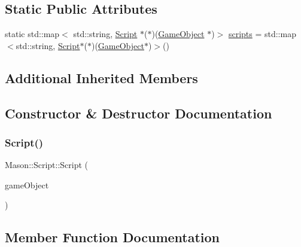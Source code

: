 \subsection*{Static Public Attributes}
\begin{DoxyCompactItemize}
\item 
static std\+::map$<$ std\+::string, \hyperlink{class_mason_1_1_script}{Script} $\ast$($\ast$)(\hyperlink{class_mason_1_1_game_object}{Game\+Object} $\ast$)$>$ \hyperlink{class_mason_1_1_script_ad7f94424b50f1a841d25c5efe95f3c73}{scripts} = std\+::map$<$std\+::string, \hyperlink{class_mason_1_1_script}{Script}$\ast$($\ast$)(\hyperlink{class_mason_1_1_game_object}{Game\+Object}$\ast$)$>$()
\end{DoxyCompactItemize}
\subsection*{Additional Inherited Members}


\subsection{Constructor \& Destructor Documentation}
\hypertarget{class_mason_1_1_script_a11d07693e51f3e22894784a6ae7a761d}{}\label{class_mason_1_1_script_a11d07693e51f3e22894784a6ae7a761d} 
\subsubsection{\texorpdfstring{Script()}{Script()}}
{\footnotesize\ttfamily Mason\+::\+Script\+::\+Script (\begin{DoxyParamCaption}\item[{\hyperlink{class_mason_1_1_game_object}{Game\+Object} $\ast$}]{game\+Object }\end{DoxyParamCaption})\hspace{0.3cm}{\ttfamily [inline]}}



\subsection{Member Function Documentation}
\hypertarget{class_mason_1_1_script_a1088013d6edc47d74643aa48a7cbbbdf}{}\label{class_mason_1_1_script_a1088013d6edc47d74643aa48a7cbbbdf} 
